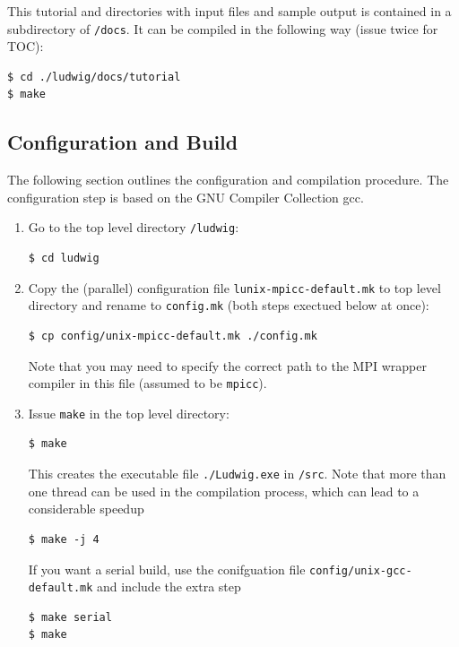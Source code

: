 \documentclass[11pt,twoside,a4paper]{article}
\begin{document}
This tutorial and directories with input files and sample output is contained in 
a subdirectory of \texttt{/docs}. It can be compiled in the following way (issue twice for TOC):

\begin{lstlisting}[style=terminalverbatim]
$ cd ./ludwig/docs/tutorial
$ make
\end{lstlisting}

\subsection{Configuration and Build}\label{configbuild}

The following section outlines the configuration and compilation 
procedure. The configuration step is based on the GNU Compiler Collection gcc.

\begin{enumerate}
\item Go to the top level directory \texttt{/ludwig}: \\
\begin{lstlisting}
$ cd ludwig
\end{lstlisting}
\item Copy the (parallel) configuration file \texttt{lunix-mpicc-default.mk}
to top level directory 
and rename to \texttt{config.mk} (both steps exectued below at once): \\
\begin{lstlisting}
$ cp config/unix-mpicc-default.mk ./config.mk
\end{lstlisting}
Note that you may need to specify the correct path to the MPI wrapper compiler
in this file (assumed to be \texttt{mpicc}).
\item Issue \texttt{make} in the top level directory: \\
\begin{lstlisting}
$ make 
\end{lstlisting}
This creates the executable file \texttt{./Ludwig.exe} in \texttt{/src}. 
Note that more than one thread can be used in the compilation process,
which can lead to a considerable speedup  
\begin{lstlisting}
$ make -j 4
\end{lstlisting} 
If you want a serial build, use the conifguation file
\texttt{config/unix-gcc-default.mk} and include the extra step
\begin{lstlisting}
$ make serial
$ make
\end{lstlisting}

\end{enumerate}
\end{document}
